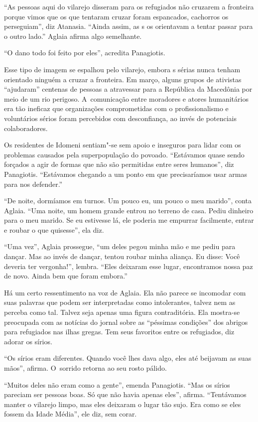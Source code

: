 ``As pessoas aqui do vilarejo disseram para os refugiados não cruzarem a
fronteira porque vimos que os que tentaram cruzar foram espancados,
cachorros os perseguiam'', diz Atanasia. ``Ainda assim, as s os
orientavam a tentar passar para o outro lado.'' Aglaia afirma algo
semelhante.

``O dano todo foi feito por eles'', acredita Panagiotis.

Esse tipo de imagem se espalhou pelo vilarejo, embora s sérias nunca
tenham orientado ninguém a cruzar a fronteira. Em março, alguns grupos de
ativistas ``ajudaram'' centenas de pessoas a atravessar para a República
da Macedônia por meio de um rio perigoso. A~comunicação entre
moradores e atores humanitários era tão ineficaz que organizações
comprometidas com o profissionalismo e voluntários sérios foram
percebidos com desconfiança, ao invés de potenciais colaboradores.

Os residentes de Idomeni sentiam"-se sem apoio e inseguros para lidar com
os problemas causados pela superpopulação do povoado. ``Estávamos quase
sendo forçados a agir de formas que não são permitidas entre seres
humanos'', diz Panagiotis. ``Estávamos chegando a um ponto em que
precisaríamos usar armas para nos defender.''

``De noite, dormíamos em turnos. Um pouco eu, um pouco o meu marido'',
conta Aglaia. ``Uma noite, um homem grande entrou no terreno de casa.
Pediu dinheiro para o meu marido. Se eu estivesse lá, ele poderia me
empurrar facilmente, entrar e roubar o que quisesse'', ela diz.

``Uma vez'', Aglaia prossegue, ``um deles pegou minha mão e me pediu
para dançar. Mas ao invés de dançar, tentou roubar minha aliança. Eu
disse: Você deveria ter vergonha!'', lembra. ``Eles deixaram esse lugar,
encontramos nossa paz de novo. Ainda bem que foram embora.''

Há um certo ressentimento na voz de Aglaia. Ela não parece se incomodar
com suas palavras que podem ser interpretadas como intolerantes, talvez nem
as perceba como tal. Talvez seja apenas uma figura contraditória.
Ela mostra-se preocupada com as notícias do jornal sobre as ``péssimas
condições'' dos abrigos para refugiados nas ilhas gregas. Tem seus
favoritos entre os refugiados, diz adorar os sírios.

``Os sírios eram diferentes. Quando você lhes dava algo, eles até
beijavam as suas mãos'', afirma. O~sorrido retorna ao seu rosto pálido.

``Muitos deles não eram como a gente'', emenda Panagiotis. ``Mas os
sírios pareciam ser pessoas boas. Só que não havia apenas eles'',
afirma. ``Tentávamos manter o vilarejo limpo, mas eles deixaram o lugar
tão sujo. Era como se eles fossem da Idade Média'', ele diz, sem corar.

